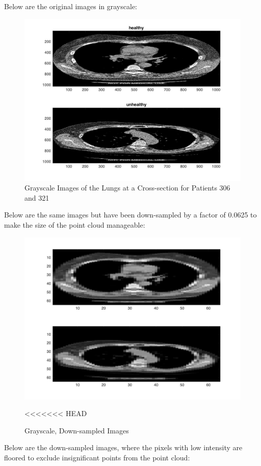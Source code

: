 \documentclass[12pt]{report}
\begin{document}
Below are the original images in grayscale:

\begin{figure}[H]
\centering
	\includegraphics[width=0.8\linewidth]{tS1.jpg}
	\caption{Grayscale Images of the Lungs at a Cross-section for Patients 306 and 321}
\end{figure}

Below are the same images but have been down-sampled by a factor of 0.0625 to make the size of the point cloud manageable:

\begin{figure}[H]
\centering
	\includegraphics[width=0.8\linewidth]{tS3.jpg}
	\caption{Grayscale, Down-sampled Images}
<<<<<<< HEAD
\end{figure}

Below are the down-sampled images, where the pixels with low intensity are floored to exclude insignificant points from the point cloud:
\end{document}

